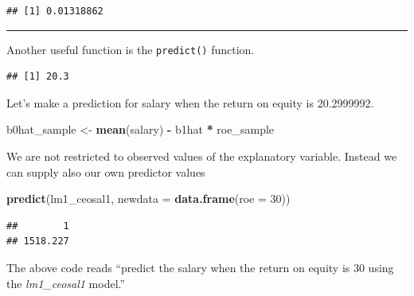 \documentclass[]{book}
\newenvironment{Shaded}{\begin{snugshade}}{\end{snugshade}}
\newcommand{\CommentTok}[1]{\textcolor[rgb]{0.56,0.35,0.01}{\textit{#1}}}
\newcommand{\DataTypeTok}[1]{\textcolor[rgb]{0.13,0.29,0.53}{#1}}
\newcommand{\DecValTok}[1]{\textcolor[rgb]{0.00,0.00,0.81}{#1}}
\newcommand{\KeywordTok}[1]{\textcolor[rgb]{0.13,0.29,0.53}{\textbf{#1}}}
\newcommand{\NormalTok}[1]{#1}
\newcommand{\OperatorTok}[1]{\textcolor[rgb]{0.81,0.36,0.00}{\textbf{#1}}}
\newcommand{\StringTok}[1]{\textcolor[rgb]{0.31,0.60,0.02}{#1}}
\begin{document}
\begin{verbatim}
## [1] 0.01318862
\end{verbatim}

\begin{center}\rule{0.5\linewidth}{\linethickness}\end{center}

Another useful function is the \texttt{predict()} function.

\begin{Shaded}
\end{Shaded}

\begin{verbatim}
## [1] 20.3
\end{verbatim}

Let's make a prediction for salary when the return on equity is
20.2999992.

\begin{Shaded}
\begin{Highlighting}[]
\NormalTok{b0hat_sample <-}\StringTok{ }\KeywordTok{mean}\NormalTok{(salary) }\OperatorTok{-}\StringTok{ }\NormalTok{b1hat }\OperatorTok{*}\StringTok{ }\NormalTok{roe_sample }
\end{Highlighting}
\end{Shaded}

We are not restricted to observed values of the explanatory variable.
Instead we can supply also our own predictor values

\begin{Shaded}
\begin{Highlighting}[]
\KeywordTok{predict}\NormalTok{(lm1_ceosal1, }\DataTypeTok{newdata =} \KeywordTok{data.frame}\NormalTok{(}\DataTypeTok{roe =} \DecValTok{30}\NormalTok{))}
\end{Highlighting}
\end{Shaded}

\begin{verbatim}
##        1 
## 1518.227
\end{verbatim}

The above code reads ``predict the salary when the return on equity is
30 using the \emph{lm1\_ceosal1} model.''
\end{document}
